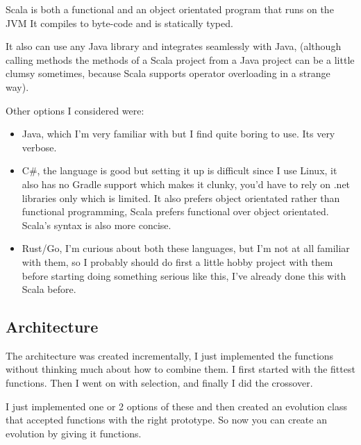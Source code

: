 \documentclass{article}
\begin{document}
Scala is both a functional and an object orientated program that runs on the JVM
It compiles to byte-code and is statically typed.

It also can use any Java library and integrates seamlessly with Java, (although
calling methods the methods of a Scala project from a Java project can be
a little clumsy sometimes, because Scala supports operator overloading in
a strange way).

Other options I considered were:
\begin{itemize}
	\item Java, which I'm very familiar with but I find quite boring to use.
		Its very verbose.
	\item C\#, the language is good but setting it up is difficult since I
		use Linux, it also has no Gradle support which makes it clunky,
		you'd have to rely on .net libraries only which is limited. It
		also prefers object orientated  rather than functional programming,
		Scala prefers functional over object orientated.
		Scala's syntax is also more concise.
	\item Rust/Go, I'm curious about both these languages, but I'm not at
		all familiar with them, so I probably should do first a little
		hobby project with them before starting doing something serious like
		this, I've already done this with Scala before.
\end{itemize}

\subsection{Architecture}
The architecture was created incrementally, I just implemented the functions
without thinking much about how to combine them.  I first started with the
fittest functions. Then I went on with selection, and finally I did the
crossover.


I just implemented one or 2 options of these and then created an evolution
class that accepted functions with the right prototype. So now you can
create an evolution by giving it functions.
\end{document}
